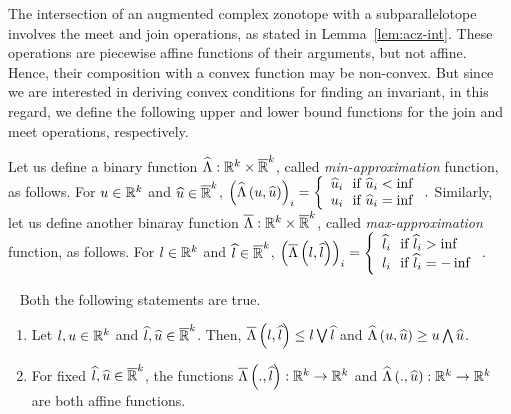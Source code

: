 The intersection of an augmented complex zonotope with a
subparallelotope involves the meet and join operations, as stated in
Lemma~\ref{lem:acz-int}.  These operations are piecewise affine
functions of their arguments, but not affine.  Hence, their
composition with a convex function may be non-convex.  But since we
are interested in deriving convex conditions for finding an invariant,
in this regard, we define the following upper and lower bound
functions for the join and meet operations, respectively.

Let us define a binary function
$\widehat{\Lambda}:\mathbb{R}^k\times\mathbb{\overline{R}}^k$,
called \emph{min-approximation} function, as follows.  For
$u\in\mathbb{R}^k$ and $\widehat{u}\in\mathbb{\overline{R}}^k$,
$\left(\widehat{\Lambda}\left(u,\widehat{u}\right)\right)_i = \left\{
\begin{array}{l}
\widehat{u}_i~~\text{if}~\widehat{u}_i<\inf\\
u_i~~\text{if}~\widehat{u}_i=\inf
\end{array}
\right..$
Similarly, let us define another binaray function       
$\overline{\Lambda}:\mathbb{R}^k\times\mathbb{\overline{R}}^k$,
called \emph{max-approximation} function, as follows.  For
$l\in\mathbb{R}^k$ and $\widehat{l}\in\mathbb{\overline{R}}^k$,
$\left(\overline{\Lambda}\left(l,\widehat{l}\right)\right)_i = \left\{
\begin{array}{l}
\widehat{l}_i~~\text{if}~\widehat{l}_i>\inf\\
l_i~~\text{if}~\widehat{l}_i=-\inf
\end{array}
\right..$
%
\begin{lemma}~\label{lem:min-max-approx}
Both the following statements are true.
\begin{enumerate}
\item Let $l,u\in\mathbb{R}^k$ and $\widehat{l},\widehat{u}\in\mathbb{\overline{R}}^k$.
  Then, $\overline{\Lambda}\left(l,\widehat{l}\right)\leq l\bigvee\widehat{l}$ and
  $\widehat{\Lambda}\left(u,\widehat{u}\right)\geq u\bigwedge\widehat{u}$.
\item For fixed $\widehat{l},\widehat{u}\in\mathbb{\overline{R}}^k$, the functions
  $\overline{\Lambda}\left(.,\widehat{l}\right):\mathbb{R}^k\rightarrow\mathbb{R}^k$ and
  $\widehat{\Lambda}\left(.,\widehat{u}\right):\mathbb{R}^k\rightarrow\mathbb{R}^k$ are both affine functions.
\end{enumerate}
\end{lemma}





